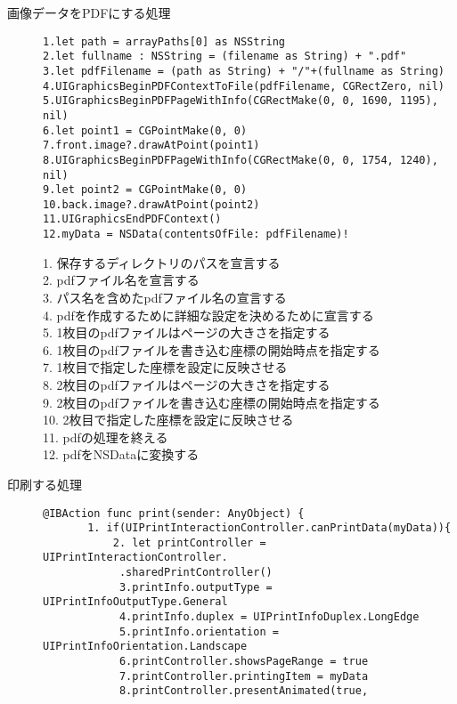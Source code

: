 \begin{description}
\item[画像データをPDFにする処理]\mbox{} 
\begin{lstlisting}[basicstyle=\ttfamily\footnotesize, frame=single]
1.let path = arrayPaths[0] as NSString
2.let fullname : NSString = (filename as String) + ".pdf"
3.let pdfFilename = (path as String) + "/"+(fullname as String)
4.UIGraphicsBeginPDFContextToFile(pdfFilename, CGRectZero, nil)
5.UIGraphicsBeginPDFPageWithInfo(CGRectMake(0, 0, 1690, 1195), nil)
6.let point1 = CGPointMake(0, 0)
7.front.image?.drawAtPoint(point1)
8.UIGraphicsBeginPDFPageWithInfo(CGRectMake(0, 0, 1754, 1240), nil)
9.let point2 = CGPointMake(0, 0)
10.back.image?.drawAtPoint(point2)
11.UIGraphicsEndPDFContext()
12.myData = NSData(contentsOfFile: pdfFilename)!
 \end{lstlisting}
1. 保存するディレクトリのパスを宣言する\\
2. pdfファイル名を宣言する\\
3. パス名を含めたpdfファイル名の宣言する\\
4. pdfを作成するために詳細な設定を決めるために宣言する\\
5. 1枚目のpdfファイルはページの大きさを指定する\\
6. 1枚目のpdfファイルを書き込む座標の開始時点を指定する\\
7. 1枚目で指定した座標を設定に反映させる\\
8. 2枚目のpdfファイルはページの大きさを指定する\\
9. 2枚目のpdfファイルを書き込む座標の開始時点を指定する\\
10. 2枚目で指定した座標を設定に反映させる\\
11. pdfの処理を終える\\
12. pdfをNSDataに変換する\\
\item[印刷する処理]\mbox{} 
\begin{lstlisting}[basicstyle=\ttfamily\footnotesize, frame=single]
@IBAction func print(sender: AnyObject) {
       1. if(UIPrintInteractionController.canPrintData(myData)){
           2. let printController = UIPrintInteractionController.
            .sharedPrintController()
            3.printInfo.outputType = UIPrintInfoOutputType.General
            4.printInfo.duplex = UIPrintInfoDuplex.LongEdge
            5.printInfo.orientation = UIPrintInfoOrientation.Landscape
            6.printController.showsPageRange = true
            7.printController.printingItem = myData
            8.printController.presentAnimated(true, 

\end{lstlisting}
\end{description}
